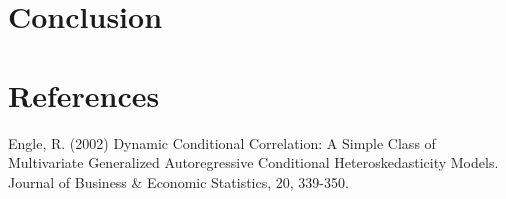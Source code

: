 \documentclass[11pt,preprint, authoryear]{elsarticle}
\numberwithin{equation}{section}
\numberwithin{figure}{section}
\numberwithin{table}{section}
\begin{document}
\hypertarget{conclusion}{%
\section{\texorpdfstring{Conclusion
\label{Conclusion}}{Conclusion }}\label{conclusion}}

\newpage

\hypertarget{references}{%
\section*{References}\label{references}}

Engle, R. (2002) Dynamic Conditional Correlation: A Simple Class of
Multivariate Generalized Autoregressive Conditional Heteroskedasticity
Models. Journal of Business \& Economic Statistics, 20, 339-350.


\end{document}
